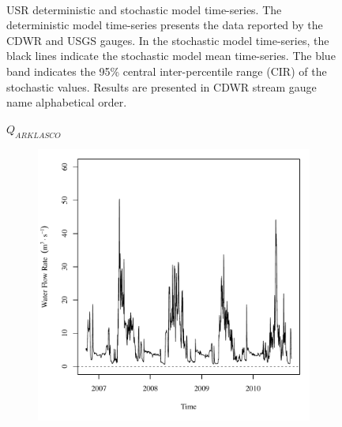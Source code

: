 \begin{linenumbers}
\begin{landscape}
\begin{figure}
\begin{subfigure}{0.7\textwidth}
		\end{subfigure}\\
		\caption[USR deterministic and stochastic model time-series.]{USR deterministic and stochastic model time-series.  The deterministic model time-series presents the data reported by the CDWR and USGS gauges.  In the stochastic model time-series, the black lines indicate the stochastic model mean time-series.  The blue band indicates the 95\% central inter-percentile range (CIR) of the stochastic values.  Results are presented in CDWR stream gauge name alphabetical order.}
		\label{fig:GaugeFlow_US}
	\end{figure}
\end{landscape}
\subfiguremid
\begin{landscape}
	\begin{figure}
		\centering
		$ Q_{ARKLASCO} $
		\begin{subfigure}{0.7\textwidth}
			\centering
			\includegraphics[width=\textwidth]{"Figures/Results_USR/Deterministic/Q U201"}
		\end{subfigure}%
		\begin{subfigure}{0.7\textwidth}
			\centering

\end{subfigure}
\end{figure}
\end{landscape}
\end{linenumbers}
